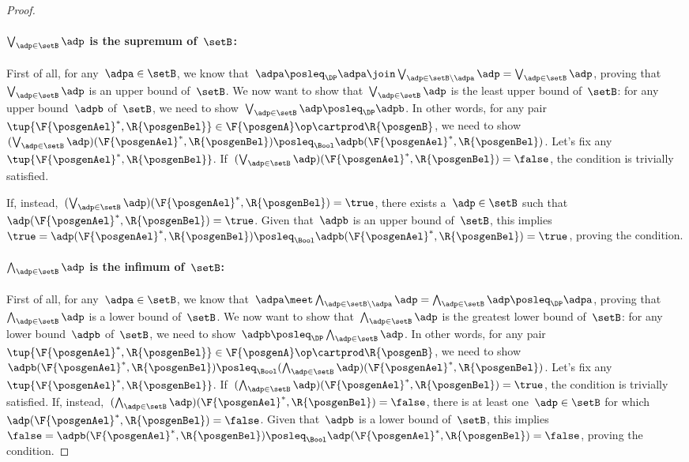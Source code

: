 \begin{proof}
    \paragraph*{$\bigvee_{\adp \in \setB} \adp$ is the supremum of~$\setB$:}
    First of all, for any~$\adpa\in \setB$, we know that~$\adpa\posleq_\DP \adpa \join \bigvee_{\adp \in \setB \backslash \adpa} \adp= \bigvee_{\adp \in \setB} \adp$, proving that~$\bigvee_{\adp \in \setB} \adp$ is an upper bound of~$\setB$.
    We now want to show that~$\bigvee_{\adp \in \setB} \adp$ is the least upper bound of~$\setB$: for any upper bound~$\adpb$ of~$\setB$, we need to show~$\bigvee_{\adp \in \setB} \adp \posleq_\DP\adpb$.
    In other words, for any pair~$\tup{\F{\posgenAel}^*,\R{\posgenBel}}\in \F{\posgenA}\op\cartprod \R{\posgenB}$, we need to show~$(\bigvee_{\adp \in \setB} \adp)(\F{\posgenAel}^*,\R{\posgenBel})\posleq_\Bool \adpb(\F{\posgenAel}^*,\R{\posgenBel})$.
    Let's fix any~$\tup{\F{\posgenAel}^*,\R{\posgenBel}}$.
    If~$(\bigvee_{\adp \in \setB} \adp)(\F{\posgenAel}^*,\R{\posgenBel})=\false$, the condition is trivially satisfied.

    If, instead,~$(\bigvee_{\adp \in \setB} \adp)(\F{\posgenAel}^*,\R{\posgenBel})=\true$, there exists a~$\adp\in \setB$ such that~$\adp(\F{\posgenAel}^*,\R{\posgenBel})=\true$.
    Given that~$\adpb$ is an upper bound of~$\setB$, this implies~$\true=\adp(\F{\posgenAel}^*,\R{\posgenBel})\posleq_\Bool \adpb(\F{\posgenAel}^*,\R{\posgenBel})=\true$, proving the condition.

    \paragraph*{$\bigwedge_{\adp \in \setB} \adp$ is the infimum of~$\setB$:}
    First of all, for any~$\adpa\in \setB$, we know that~$\adpa \meet \bigwedge_{\adp \in \setB \backslash \adpa} \adp= \bigwedge_{\adp \in \setB} \adp \posleq_\DP \adpa$, proving that~$\bigwedge_{\adp \in \setB} \adp$ is a lower bound of~$\setB$.
    We now want to show that~$\bigwedge_{\adp \in \setB} \adp$ is the greatest lower bound of~$\setB$: for any lower bound~$\adpb$ of~$\setB$, we need to show~$\adpb\posleq_\DP\bigwedge_{\adp \in \setB} \adp $.
    In other words, for any pair~$\tup{\F{\posgenAel}^*,\R{\posgenBel}}\in \F{\posgenA}\op\cartprod \R{\posgenB}$, we need to show~$\adpb(\F{\posgenAel}^*,\R{\posgenBel}) \posleq_\Bool (\bigwedge_{\adp \in \setB} \adp)(\F{\posgenAel}^*,\R{\posgenBel})$.
    Let's fix any~$\tup{\F{\posgenAel}^*,\R{\posgenBel}}$.
    If~$(\bigwedge_{\adp \in \setB} \adp)(\F{\posgenAel}^*,\R{\posgenBel})=\true$, the condition is trivially satisfied.
    If, instead,~$(\bigwedge_{\adp \in \setB} \adp)(\F{\posgenAel}^*,\R{\posgenBel})=\false$, there is at least one~$\adp\in \setB$ for which~$\adp(\F{\posgenAel}^*,\R{\posgenBel})=\false$.
    Given that~$\adpb$ is a lower bound of~$\setB$, this implies~$\false=\adpb(\F{\posgenAel}^*,\R{\posgenBel})\posleq_\Bool \adp(\F{\posgenAel}^*,\R{\posgenBel})=\false$, proving the condition.
\end{proof}

